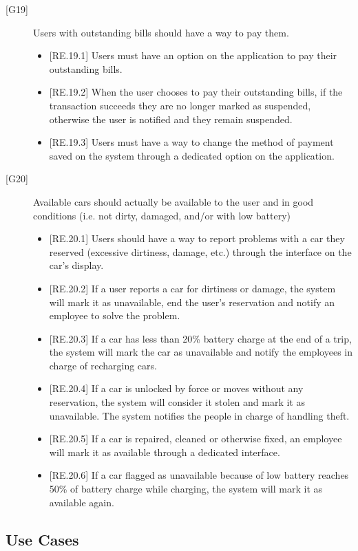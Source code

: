 \documentclass[english]{article}
\begin{document}
\begin{description}
\item[{[G19]}]{Users with outstanding bills should have a way to pay them.
\begin{itemize}
	\item{[RE.19.1] Users must have an option on the application to pay their outstanding bills.}
	\item{[RE.19.2] When the user chooses to pay their outstanding bills, if the transaction succeeds they are no longer marked as suspended, otherwise the user is notified and they remain suspended.}
	\item{[RE.19.3] Users must have a way to change the method of payment saved on the system through a dedicated option on the application.}
\end{itemize}
}

\item[{[G20]}]{Available cars should actually be available to the user and in good conditions (i.e. not dirty, damaged, and/or with low battery)
\begin{itemize}
	\item{[RE.20.1] Users should have a way to report problems with a car they reserved (excessive dirtiness, damage, etc.) through the interface on the car's display.}
	\item{[RE.20.2] If a user reports a car for dirtiness or damage, the system will mark it as unavailable, end the user's reservation and notify an employee to solve the problem.}
	\item{[RE.20.3] If a car has less than 20\% battery charge at the end of a trip, the system will mark the car as unavailable and notify the employees in charge of recharging cars.}
	\item{[RE.20.4] If a car is unlocked by force or moves without any reservation, the system will consider it stolen and mark it as unavailable. The system notifies the people in charge of handling theft.}
	\item{[RE.20.5] If a car is repaired, cleaned or otherwise fixed, an employee will mark it as available through a dedicated interface.}
	\item{[RE.20.6] If a car flagged as unavailable because of low battery reaches 50\% of battery charge while charging, the system will mark it as available again.}
\end{itemize}
}

\end{description}

\newpage
\subsection{Use Cases}
\end{document}
